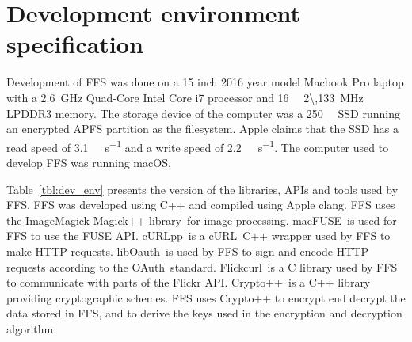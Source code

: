 \section{Development environment specification}
\label{sec:dev_env}
Development of \gls{FFS} was done on a 15 inch 2016 year model Macbook Pro laptop with a \SI{2.6}{\giga\hertz} \mbox{Quad-Core} Intel Core i7 processor and \SI{16}{\giga\byte} \SI{2\,133}{\mega\hertz} LPDDR3 memory. The storage device of the computer was a \SI{250}{\giga\byte} \gls{SSD} running an encrypted \gls{APFS} partition as the filesystem. Apple claims that the \gls{SSD} has a read speed of \SI[per-mode = symbol]{3.1}{\giga\byte\per\second} and a write speed of \SI[per-mode = symbol]{2.2}{\giga\byte\per\second}. The computer used to develop FFS was running macOS.

Table~\ref{tbl:dev_env} presents the version of the libraries, \gls{API}s and tools used by FFS. FFS was developed using C++ and compiled using Apple clang. \gls{FFS} uses the ImageMagick Magick++ library\,\cite{ImageMagick2022} for image processing. macFUSE\,\cite{HomeMacFUSE} is used for \gls{FFS} to use the \gls{FUSE} \gls{API}. cURLpp\,\cite{barrette-lapierreCURLpp2022} is a cURL\,\cite{CurlCurl2022} C++ wrapper used by \gls{FFS} to make HTTP requests. libOauth\,\cite{Liboauth} is used by \gls{FFS} to sign and encode HTTP requests according to the OAuth\,\cite{barrette-lapierreCURLpp2022} standard. Flickcurl\,\cite{beckettFlickcurlLibraryFlickr} is a C library used by \gls{FFS} to communicate with parts of the Flickr \gls{API}. Crypto++\,\cite{CryptoLibraryFree} is a C++ library providing cryptographic schemes. \gls{FFS} uses Crypto++ to encrypt end decrypt the data stored in \gls{FFS}, and to derive the keys used in the encryption and decryption algorithm. 


